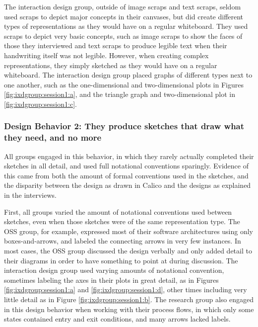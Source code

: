 The interaction design group, outside of image scraps and text scraps, seldom used scraps to depict major concepts in their canvases, but did create different types of representations as they would have on a regular whiteboard. They used scraps to depict very basic concepts, such as image scraps to show the faces of those they interviewed and text scraps to produce legible text when their handwriting itself was not legible. However, when creating complex representations, they simply sketched as they would have on a regular whiteboard. The interaction design group placed graphs of different types next to one another, such as the one-dimensional and two-dimensional plots in Figures \ref{fig:ixdgroup:session1:a}, and the triangle graph and two-dimensional plot in \ref{fig:ixdgroup:session1:c}. 


\subsubsection{Design Behavior 2: They produce sketches that draw what they need, and no more}

All groups engaged in this behavior, in which they rarely actually completed their sketches in all detail, and used full notational conventions sparingly. Evidence of this came from both the amount of formal conventions used in the sketches, and the disparity between the design as drawn in Calico and the designs as explained in the interviews.

First, all groups varied the amount of notational conventions used between sketches, even when those sketches were of the same representation type. The OSS group, for example, expressed most of their software architectures using only boxes-and-arrows, and labeled the connecting arrows in very few instances. In most cases, the OSS group discussed the design verbally and only added detail to their diagrams in order to have something to point at during discussion. The interaction design group used varying amounts of notational convention, sometimes labeling the axes in their plots in great detail, as in Figures \ref{fig:ixdgroup:session1:a} and \ref{fig:ixdgroup:session1:d}, other times including very little detail as in Figure \ref{fig:ixdgroup:session1:b}. The research group also engaged in this design behavior when working with their process flows, in which only some states contained entry and exit conditions, and many arrows lacked labels. 

